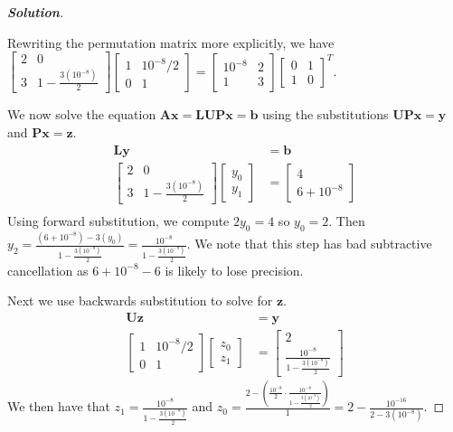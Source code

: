 \documentclass[11pt]{article}
\renewcommand{\vec}[1]{\mathbf{#1}}
\newenvironment{solution}{%
  \begin{proof}[\textbf{Solution}]$ $\par\nobreak\ignorespaces
}{%
  \end{proof}
}
\theoremstyle{definition}
\begin{document}
\begin{solution}
Rewriting the permutation matrix more explicitly, we have $\begin{bmatrix*}2 & 0 \\3 & 1 - \frac{3(10^{-8})}{2}\end{bmatrix*}\begin{bmatrix*}1 & 10^{-8}/2 \\ 0 & 1\end{bmatrix*} = \begin{bmatrix*}10^{-8} & 2 \\ 1 & 3\end{bmatrix*}\begin{bmatrix*}0 & 1 \\ 1 & 0\end{bmatrix*}^{T}$.

We now solve the equation $\vec{A}\vec{x} = \vec{LUPx} = \vec{b}$ using the substitutions $\vec{UPx} = \vec{y}$ and $\vec{Px} = \vec{z}$.
\begin{align*}
    \vec{Ly} &= \vec{b} \\
    \begin{bmatrix*}2 & 0 \\3 & 1 - \frac{3(10^{-8})}{2}\end{bmatrix*}\begin{bmatrix*}y_0 \\ y_1\end{bmatrix*} &= \begin{bmatrix*} 4 \\ 6+10^{-8} \end{bmatrix*} \\
\end{align*}
Using forward substitution, we compute $2y_0 = 4$ so $y_0 = 2$. Then $y_2 = \frac{(6 + 10^{-8}) - 3(y_0)}{1 - \frac{3(10^{-8})}{2}} = \frac{10^{-8}}{1 - \frac{3(10^{-8})}{2}}$. We note that this step has bad subtractive cancellation as $6 + 10^{-8} - 6$ is likely to lose precision.

Next we use backwards substitution to solve for $\vec{z}$.
\begin{align*}
    \vec{Uz} &= \vec{y} \\
    \begin{bmatrix*}1 & 10^{-8}/2 \\ 0 & 1\end{bmatrix*}\begin{bmatrix*}z_0 \\ z_1 \end{bmatrix*} &= \begin{bmatrix*}2 \\ \frac{10^{-8}}{1 - \frac{3(10^{-8})}{2}}\end{bmatrix*}
\end{align*}
We then have that $z_1 = \frac{10^{-8}}{1 - \frac{3(10^{-8})}{2}}$ and $z_0 = \frac{2 - \left(\frac{10^{-8}}{2} \cdot \frac{10^{-8}}{1 - \frac{3(10^{-8})}{2}}\right)}{1} = 2 - \frac{10^{-16}}{2 - 3(10^{-8})}$.


\end{solution}
\end{document}
